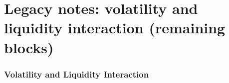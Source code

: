 \documentclass[a4paper,oneside,openany]{book}
\begin{document}
\chapter*{Legacy notes: volatility and liquidity interaction (remaining blocks)}

\subsection*{Volatility and Liquidity Interaction}

\end{document}
